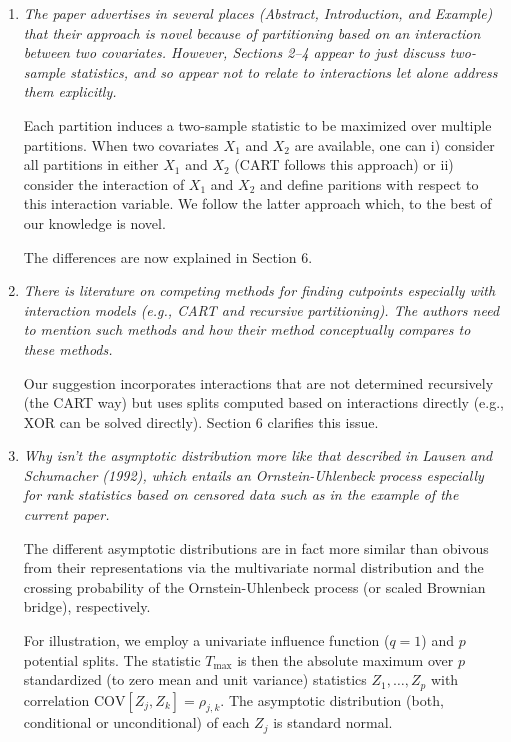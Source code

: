 \documentclass[11pt,a4paper]{article}
\begin{document}
\begin{enumerate}

  \item \textit{The paper advertises in several places (Abstract,
        Introduction, and Example) that their approach is novel because
	of partitioning based on an interaction between two covariates.
	However, Sections 2--4 appear to just discuss two-sample statistics,
	and so appear not to relate to interactions let alone address them
	explicitly.}
	
        Each partition induces a two-sample statistic to be maximized
        over multiple partitions. When two covariates $X_1$ and $X_2$ are available,
        one can i) consider all partitions in either $X_1$ and $X_2$ (CART follows
        this approach) or ii) consider the interaction of $X_1$ and $X_2$ 
        and define paritions with respect to this interaction variable.
        We follow the latter approach which, to the best of our knowledge is novel.

        The differences are now explained in Section 6.
	
  \item \textit{There is literature on competing methods for finding cutpoints
        especially with interaction models (e.g., CART and recursive partitioning).
	The authors need to mention such methods and how their method conceptually
	compares to these methods.}
	
	Our suggestion incorporates interactions that 
        are not determined recursively (the CART way) but uses splits computed based on 
	interactions directly (e.g., XOR can be solved directly). Section 6
        clarifies this issue.

  \item \textit{Why isn't the asymptotic distribution more like that described
        in Lausen and Schumacher (1992), which entails an Ornstein-Uhlenbeck process
	especially for rank statistics based on censored data such as in the example
	of the current paper.}
	
        The different asymptotic distributions are in fact more similar than obivous
	from their representations via the multivariate normal distribution and the
	crossing probability of the Ornstein-Uhlenbeck process (or scaled Brownian
	bridge), respectively. 
	
	For illustration, we employ a univariate influence function ($q = 1$) and
	$p$ potential splits. The statistic $T_{\max}$ is then the absolute maximum over
	$p$ standardized (to zero mean and unit variance) statistics $Z_1, \dots, Z_p$
	with correlation $\mbox{COV}[Z_j, Z_k] = \rho_{j, k}$. The asymptotic distribution
	(both, conditional or unconditional) of each $Z_j$ is standard normal.
	

\end{enumerate}
\end{document}
